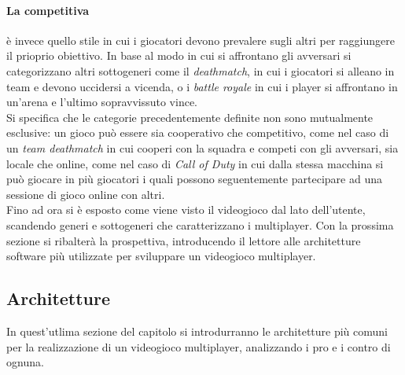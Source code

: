         \paragraph{La competitiva} è invece quello stile in cui i giocatori devono prevalere sugli altri per raggiungere il prioprio obiettivo. In base al modo in cui si affrontano
            gli avversari si categorizzano altri sottogeneri come il \textit{deathmatch}, in cui i giocatori si alleano in team e devono uccidersi a vicenda, o i \textit{battle royale}
            in cui i player si affrontano in un'arena e l'ultimo sopravvissuto vince.\\    
        
        Si specifica che le categorie precedentemente definite non sono mutualmente esclusive: un gioco può essere sia cooperativo che competitivo, come nel caso di un \textit{team 
        deathmatch} in cui cooperi con la squadra e competi con gli avversari, sia locale che online, come nel caso di \textit{Call of Duty} in cui dalla stessa macchina si può 
        giocare in più giocatori i quali possono seguentemente partecipare ad una sessione di gioco online con altri.\\
        Fino ad ora si è esposto come viene visto il videogioco dal lato dell'utente, scandendo generi e sottogeneri che caratterizzano i multiplayer. Con la prossima sezione
        si ribalterà la prospettiva, introducendo il lettore alle architetture software più utilizzate per sviluppare un videogioco multiplayer.
    \subsection{Architetture}\label{subsec:MultiArchitetture}
        In quest'utlima sezione del capitolo si introdurranno le architetture più comuni per la realizzazione di un videogioco multiplayer, analizzando i pro e i contro di ognuna.
